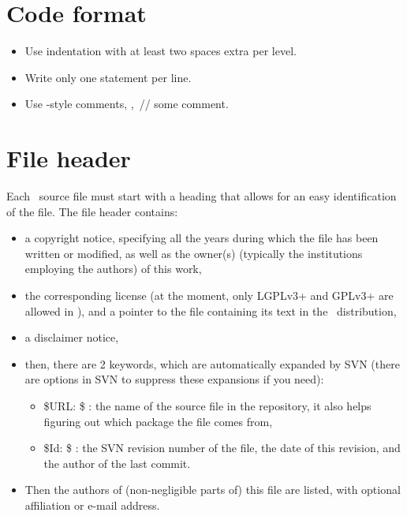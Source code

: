 \section{Code format\label{sec:code_format}}

\begin{itemize}
\item Use indentation with at least two spaces extra per level.%
\item Write only one statement per line.
\item Use \CC-style comments, \eg,~{\ccFont // some comment}.%
\end{itemize}


\section{File header\label{sec:file_header}}

Each \cgal\ source file must start with a heading that allows for an easy
identification of the file.  The file header contains:
\begin{itemize}
\item a copyright notice, specifying all the years during which the file has
been written or modified, as well as the owner(s) (typically the institutions
employing the authors) of this work,
\item the corresponding license (at the moment, only LGPLv3+ and GPLv3+
are allowed in \cgal), and a pointer to the file containing its text in the
\cgal\ distribution,
\item a disclaimer notice,
\item then, there are 2 keywords, which are automatically expanded by SVN
(there are options in SVN to suppress these expansions if you need):
\begin{itemize}
\item \${}URL: \$ : the name of the source file in the repository, it also
helps figuring out which package the file comes from,
\item \${}Id: \$ : the SVN revision number of the file, the date of this revision,
and the author of the last commit.
\end{itemize}
\item Then the authors of (non-negligible parts of) this file are listed, with
optional affiliation or e-mail address.
\end{itemize}

